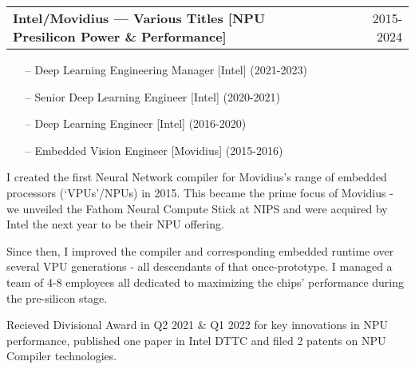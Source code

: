 \documentclass[a4paper,12pt]{article}
\makeatletter
\newenvironment{jobshort}[2]
    {
    \begin{tabularx}{\linewidth}{@{}l X r@{}}
    \textbf{#1} & \hfill &  #2 \\[3.75pt]
    \end{tabularx}
    }
    {
    }
\makeatother
\begin{document}
\begin{jobshort}{Intel/Movidius --- Various Titles [NPU Presilicon Power \& Performance]}{2015-2024}

\vspace{-15pt}
\begin{itemize}[noitemsep,topsep=0pt,parsep=0pt,partopsep=0pt]
    \item[--] Deep Learning Engineering Manager [Intel] (2021-2023)
    \item[--] Senior Deep Learning Engineer [Intel] (2020-2021)
    \item[--] Deep Learning Engineer [Intel] (2016-2020)
    \item[--] Embedded Vision Engineer [Movidius] (2015-2016)
\end{itemize}

I created the first Neural Network compiler for Movidius's range of embedded processors (‘VPUs’/NPUs) in 2015. This became the prime focus of Movidius - we unveiled the Fathom Neural Compute Stick at NIPS and were acquired by Intel the next year to be their NPU offering.

Since then, I improved the compiler and corresponding embedded runtime over several VPU generations - all descendants of that once-prototype. I managed a team of 4-8 employees all dedicated to maximizing the chips' performance during the pre-silicon stage.

Recieved Divisional Award in Q2 2021 & Q1 2022 for key innovations in NPU performance, published one paper in Intel DTTC and filed 2 patents on NPU Compiler technologies.


\end{jobshort}
\end{document}
